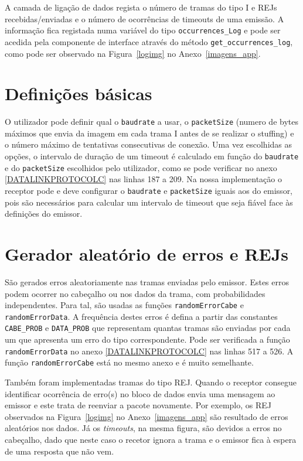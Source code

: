\documentclass[11pt,a4paper,reqno]{report}
\numberwithin{equation}{section}
\begin{document}
A camada de ligação de dados regista o número de tramas do tipo I e REJs recebidas/enviadas e o número de ocorrências de timeouts de uma emissão. A informação fica registada numa variável do tipo \verb|occurrences_Log| e pode ser acedida pela componente de interface através do método \verb|get_occurrences_log|, como pode ser observado na Figura~\ref{logimg} no Anexo~\ref{imagens_app}.

\section{Definições básicas}

O utilizador pode definir qual o \verb|baudrate| a usar, o \verb|packetSize| (numero de bytes máximos que envia da imagem em cada trama I antes de se realizar o stuffing) e o número máximo de tentativas consecutivas de conexão.
Uma vez escolhidas as opções, o intervalo de duração de um timeout é calculado em função do \verb|baudrate| e do \verb|packetSize| escolhidos pelo utilizador, como se pode verificar no anexo \ref{DATALINKPROTOCOLC} nas linhas 187 a 209. Na nossa implementação o receptor pode e deve configurar o \verb|baudrate| e \verb|packetSize| iguais aos do emissor, pois são necessários para calcular um intervalo de timeout que seja fiável face às definições do emissor.

\section{Gerador aleatório de erros e REJs}
São gerados erros aleatoriamente nas tramas enviadas pelo emissor. Estes erros podem ocorrer no cabeçalho ou nos dados da trama, com probabilidades independentes. Para tal, são usadas as funções \verb|randomErrorCabe| e \verb|randomErrorData|. A frequência destes erros é defina a partir das constantes \verb|CABE_PROB| e \verb|DATA_PROB| que representam quantas tramas são enviadas por cada um que apresenta um erro do tipo correspondente. Pode ser verificada a função \verb|randomErrorData| no anexo \ref{DATALINKPROTOCOLC} nas linhas 517 a 526. A função \verb|randomErrorCabe| está no mesmo anexo e é muito semelhante.

Também foram implementadas tramas do tipo REJ. Quando o receptor consegue identificar ocorrência de erro(s) no bloco de dados envia uma mensagem ao emissor e este trata de reenviar a pacote novamente. Por exemplo, os REJ observados na Figura~\ref{logimg} no Anexo~\ref{imagens_app} são resultado de erros aleatórios nos dados. Já os \emph{timeouts}, na mesma figura, são devidos a erros no cabeçalho, dado que neste caso o recetor ignora a trama e o emissor fica à espera de uma resposta que não vem.
\end{document}

